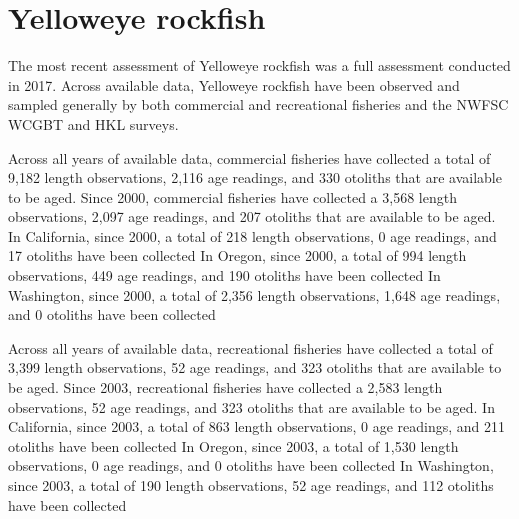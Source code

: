 \documentclass[11pt,
  english,
  letterpaper,
]{article}
\begin{document}

\hypertarget{yelloweye-rockfish}{%
\section{Yelloweye rockfish}\label{yelloweye-rockfish}}

\leavevmode\tagmcend\tagstructend


The most recent assessment of Yelloweye rockfish was a full assessment conducted in 2017. Across available data, Yelloweye rockfish have been observed and sampled generally by both commercial and recreational fisheries and the NWFSC WCGBT and HKL surveys.

\leavevmode\tagmcend\tagstructend\par


Across all years of available data, commercial fisheries have collected a total of 9,182 length observations, 2,116 age readings, and 330 otoliths that are available to be aged. Since 2000, commercial fisheries have collected a 3,568 length observations, 2,097 age readings, and 207 otoliths that are available to be aged. In California, since 2000, a total of 218 length observations, 0 age readings, and 17 otoliths have been collected In Oregon, since 2000, a total of 994 length observations, 449 age readings, and 190 otoliths have been collected In Washington, since 2000, a total of 2,356 length observations, 1,648 age readings, and 0 otoliths have been collected

\leavevmode\tagmcend\tagstructend\par


Across all years of available data, recreational fisheries have collected a total of 3,399 length observations, 52 age readings, and 323 otoliths that are available to be aged. Since 2003, recreational fisheries have collected a 2,583 length observations, 52 age readings, and 323 otoliths that are available to be aged. In California, since 2003, a total of 863 length observations, 0 age readings, and 211 otoliths have been collected In Oregon, since 2003, a total of 1,530 length observations, 0 age readings, and 0 otoliths have been collected In Washington, since 2003, a total of 190 length observations, 52 age readings, and 112 otoliths have been collected
\end{document}
